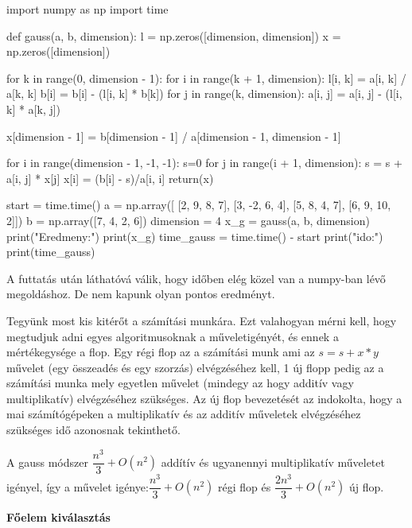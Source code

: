 \begin{python}
import numpy as np
import time

def gauss(a, b, dimension):
    l = np.zeros([dimension, dimension])
    x = np.zeros([dimension])

    for k in range(0, dimension - 1):
        for i in range(k + 1, dimension):
            l[i, k] = a[i, k] / a[k, k]
            b[i] = b[i] - (l[i, k] * b[k])
            for j in range(k, dimension):
                a[i, j] = a[i, j] - (l[i, k] * a[k, j])

    x[dimension - 1] = b[dimension - 1] / a[dimension - 1, dimension - 1]
        
    for i in range(dimension - 1, -1, -1):
        s=0
        for j in range(i + 1, dimension):
            s = s + a[i, j] * x[j]
            x[i] = (b[i] - s)/a[i, i]
    return(x)

start = time.time()
a = np.array([
    [2,  9,  8, 7],
    [3, -2,  6, 4],
    [5,  8,  4, 7],
    [6,  9, 10, 2]])
b = np.array([7, 4, 2, 6])
dimension = 4
x_g = gauss(a, b, dimension)
print("Eredmeny:\n")
print(x_g)
time_gauss = time.time() - start
print("\nFutasi ido:\n")
print(time_gauss)
\end{python}
A futtatás után láthatóvá válik, hogy időben elég közel van a numpy-ban lévő megoldáshoz. De
nem kapunk olyan pontos eredményt.

    Tegyünk most kis kitérőt a számítási munkára. Ezt valahogyan mérni kell,
hogy megtudjuk adni egyes algoritmusoknak a műveletigényét, és ennek a
mértékegysége a flop. Egy régi flop az a számítási munk ami az
\(s = s + x*y\) művelet (egy összeadés és egy szorzás) elvégzéséhez kell, 1
új flopp pedig az a számítási munka mely egyetlen művelet (mindegy az
hogy additív vagy multiplikatív) elvégzéséhez szükséges. Az új flop
bevezetését az indokolta, hogy a mai számítógépeken a multiplikatív és
az additív műveletek elvégzéséhez szükséges idő azonosnak tekinthető.

    A gauss módszer $\dfrac{n^3}{3} + O(n^2)$ addítív és ugyanennyi
multiplikatív műveletet igényel, így a művelet igénye:\(\dfrac {n^3}{3}+
O(n^2) \) régi flop és \(\dfrac {2n^3}{3}+ O(n^2) \) új flop.

\bigskip

\noindent\textbf{Főelem kiválasztás}

\medskip

